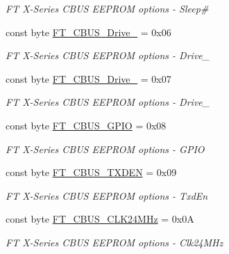 \begin{DoxyCompactItemize}
\begin{DoxyCompactList}\small\item\em FT X-\/\+Series C\+B\+US E\+E\+P\+R\+OM options -\/ Sleep\# \end{DoxyCompactList}\item 
const byte \mbox{\hyperlink{class_f_t_d2_x_x___n_e_t_1_1_f_t_d_i_1_1_f_t___x_s_e_r_i_e_s___c_b_u_s___o_p_t_i_o_n_s_a75dfa9be830c29d200068658301755db}{F\+T\+\_\+\+C\+B\+U\+S\+\_\+\+Drive\+\_}} = 0x06
\begin{DoxyCompactList}\small\item\em FT X-\/\+Series C\+B\+US E\+E\+P\+R\+OM options -\/ Drive\+\_ \end{DoxyCompactList}\item 
const byte \mbox{\hyperlink{class_f_t_d2_x_x___n_e_t_1_1_f_t_d_i_1_1_f_t___x_s_e_r_i_e_s___c_b_u_s___o_p_t_i_o_n_s_ae4cf796faccecffe70fb4673960c1b5c}{F\+T\+\_\+\+C\+B\+U\+S\+\_\+\+Drive\+\_}} = 0x07
\begin{DoxyCompactList}\small\item\em FT X-\/\+Series C\+B\+US E\+E\+P\+R\+OM options -\/ Drive\+\_ \end{DoxyCompactList}\item 
const byte \mbox{\hyperlink{class_f_t_d2_x_x___n_e_t_1_1_f_t_d_i_1_1_f_t___x_s_e_r_i_e_s___c_b_u_s___o_p_t_i_o_n_s_a4a847a549cd4e3a511bccf9b8aa4dcc6}{F\+T\+\_\+\+C\+B\+U\+S\+\_\+\+G\+P\+IO}} = 0x08
\begin{DoxyCompactList}\small\item\em FT X-\/\+Series C\+B\+US E\+E\+P\+R\+OM options -\/ G\+P\+IO \end{DoxyCompactList}\item 
const byte \mbox{\hyperlink{class_f_t_d2_x_x___n_e_t_1_1_f_t_d_i_1_1_f_t___x_s_e_r_i_e_s___c_b_u_s___o_p_t_i_o_n_s_ad686561138220fa700f02d84b45846dc}{F\+T\+\_\+\+C\+B\+U\+S\+\_\+\+T\+X\+D\+EN}} = 0x09
\begin{DoxyCompactList}\small\item\em FT X-\/\+Series C\+B\+US E\+E\+P\+R\+OM options -\/ Txd\+En \end{DoxyCompactList}\item 
const byte \mbox{\hyperlink{class_f_t_d2_x_x___n_e_t_1_1_f_t_d_i_1_1_f_t___x_s_e_r_i_e_s___c_b_u_s___o_p_t_i_o_n_s_a8d169592e60d33cdea8ea794722d072d}{F\+T\+\_\+\+C\+B\+U\+S\+\_\+\+C\+L\+K24\+M\+Hz}} = 0x0A
\begin{DoxyCompactList}\small\item\em FT X-\/\+Series C\+B\+US E\+E\+P\+R\+OM options -\/ Clk24\+M\+Hz \end{DoxyCompactList}\item 

\end{DoxyCompactItemize}
